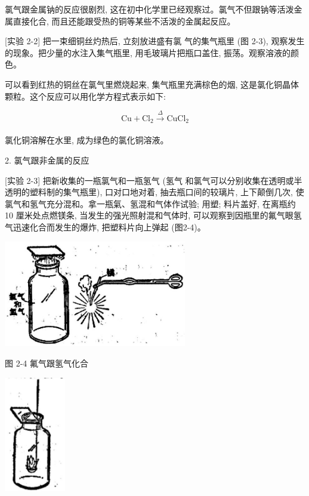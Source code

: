 \documentclass[10pt]{article}
\begin{document}
氯气跟金属钠的反应很剧烈, 这在初中化学里已经观察过。氯气不但跟钠等活泼金属直接化合, 而且还能跟受热的铜等某些不活泼的金属起反应。

[实验 2-2] 把一束细铜丝灼热后, 立刻放进盛有氯 气的集气瓶里 (图 2-3), 观察发生的现象。把少量的水注入集气瓶里, 用毛玻璃片把瓶口盖住, 振荡。观察溶液的颜色。

可以看到红热的铜丝在氯气里燃烧起来, 集气瓶里充满棕色的烟, 这是氯化铜晶体颗粒。这个反应可以用化学方程式表示如下:

\[
\mathrm{{Cu}} + {\mathrm{{Cl}}}_{2}\xrightarrow[]{\Delta }{\mathrm{{CuCl}}}_{2}
\]

氯化铜溶解在水里, 成为绿色的氯化铜溶液。

2. 氯气跟非金属的反应

[实验 2-3] 把新收集的一瓶氯气和一瓶氢气 (氢气 和氯气可以分别收集在透明或半透明的塑料制的集气瓶里), 口对口地对着, 抽去瓶口间的较璃片, 上下颠倒几次, 使氯气和氢气充分混和。拿一瓶氣、氢混和气体作试验; 用塑; 料片盖好, 在离瓶约 10 厘米处点燃镁条, 当发生的强光照射混和气体时, 可以观察到因瓶里的氟气眼氢气迅速化合而发生的爆炸, 把塑料片向上弹起 (图2-4)。

\begin{center}
\includegraphics[max width=0.6\textwidth]{images/01912d0f-097c-7e75-8f32-4f326cd86c9f_34_366956.jpg}
\end{center}

图 2-4 氟气跟氢气化合

\begin{center}
\includegraphics[max width=0.2\textwidth]{images/01912d0f-097c-7e75-8f32-4f326cd86c9f_34_152173.jpg}
\end{center}
\end{document}
